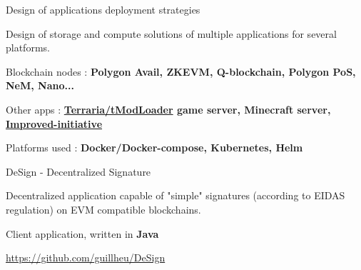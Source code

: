 \begin{cventries}
  \cventry
      {} %
      {Design of applications deployment strategies} %
      {} %
      {} %
      {
        \begin{cvitems} %
          \item {Design of storage and compute solutions of multiple applications for several platforms.}
          \item {Blockchain nodes : \textbf{Polygon Avail, ZKEVM, Q-blockchain, Polygon PoS, NeM, Nano...}}
          \item {Other apps : \textbf{\href{https://github.com/guillheu/tmodloader-docker}{Terraria/tModLoader} game server, Minecraft server, \href{https://github.com/cynicaloptimist/improved-initiative}{Improved-initiative}}}
          \item {Platforms used : \textbf{Docker/Docker-compose, Kubernetes, Helm}\\}
        \end{cvitems}
      }
  \cventry
    {} %
    {DeSign - Decentralized Signature} %
    {} %
    {} %
    {
      \begin{cvitems} %
        \item {Decentralized application capable of "simple" signatures (according to EIDAS regulation) on EVM compatible blockchains.}
        \item {Client application, written in \textbf{Java}}
        \item {\href{https://github.com/guillheu/DeSign}{https://github.com/guillheu/DeSign}\\}
      \end{cvitems}
    }
 

\end{cventries}
